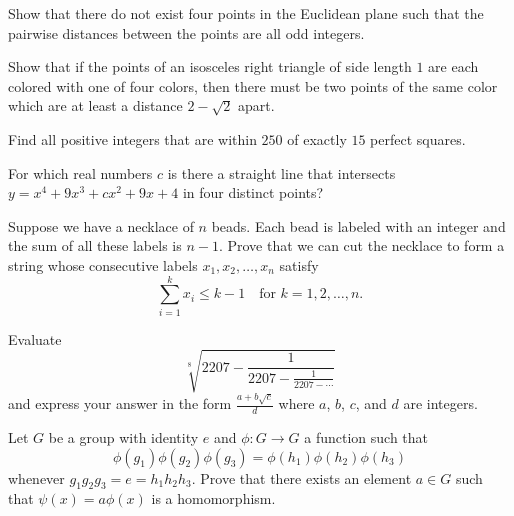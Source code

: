 \documentclass[12pt]{article}
\begin{document}
    \begin{exercise}[1993 B5]
        Show that there do not exist four points in the Euclidean plane such that the pairwise distances between the points are all odd integers. 
    \end{exercise}

    \begin{exercise}[1994 A3]
        Show that if the points of an isosceles right triangle of side length $1$ are each colored with one of four colors, then there must be two points of the same color which are at least a distance $2-\sqrt{2}$ apart. 
    \end{exercise}

    \begin{exercise}[1994 B1]
        Find all positive integers that are within $250$ of exactly $15$ perfect squares.
    \end{exercise}
        
    \begin{exercise}[1994 B2]
        For which real numbers $c$ is there a straight line that intersects $y=x^4+9x^3+cx^2+9x+4$ in four distinct points?
    \end{exercise}

    \begin{exercise}[1995 A4]
        Suppose we have a necklace of $n$ beads. Each bead is labeled with an integer and the sum of all these labels is $n - 1$. Prove that we can cut the necklace to form a string whose consecutive labels $x_1,x_2, \ldots, x_n$ satisfy
        \[\sum_{i = 1}^{k} x_{i} \leq k - 1 \quad \text{for $k = 1, 2, \ldots, n$}.\]
    \end{exercise}

    \begin{exercise}[1995 B4]
        Evaluate
        \[\sqrt[8]{2207 - \frac{1}{2207-\frac{1}{2207-\cdots}}}\] and express your answer in the form $\frac{a+b\sqrt{c}}{d}$ where $a$, $b$, $c$, and $d$ are integers.
    \end{exercise}

    \begin{exercise}[1997 A4]
        Let $G$ be a group with identity $e$ and $\phi: G \rightarrow G$ a function such that 
        \[\phi(g_{1})\phi(g_{2})\phi(g_{3}) = \phi(h_{1})\phi(h_{2})\phi(h_{3})
        \]
        whenever $g_{1}g_{2}g_{3} = e = h_{1}h_{2}h_{3}$. Prove that there exists an element $a \in G$ such that $\psi(x) = a\phi(x)$ is a homomorphism. 
    \end{exercise}
\end{document}

